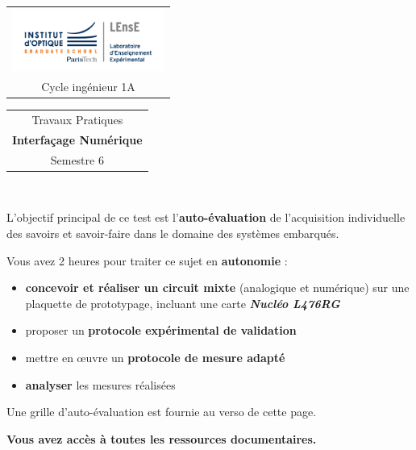 \Large 
\begin{tabular}{c}
\includegraphics[width=5cm]{logoLEnsE.png}\\
Cycle ingénieur 1A
\end{tabular}
\hfill
\begin{tabular}{c}
Travaux Pratiques \\
\textbf{Interfaçage Numérique} \\
Semestre 6 \\
\end{tabular}\\
\normalsize 

\bigskip

\begin{mdframed}[style=aavbox,frametitle={Test individuel}]
	
L'objectif principal de ce test est l'\textbf{auto-évaluation} de l'acquisition individuelle des savoirs et savoir-faire dans le domaine des systèmes embarqués.

Vous avez 2 heures pour traiter ce sujet en \textbf{autonomie} :
\begin{itemize}
	\item \textbf{concevoir et réaliser un circuit mixte} (analogique et numérique) sur une plaquette de prototypage, incluant une carte \textbf{\textit{Nucléo L476RG}}
	\item proposer un \textbf{protocole expérimental de validation}
	\item mettre en \oe{}uvre un \textbf{protocole de mesure adapté}
	\item \textbf{analyser} les mesures réalisées
\end{itemize}

Une grille d'auto-évaluation est fournie au verso de cette page. 

\textbf{Vous avez accès à toutes les ressources documentaires.}
\end{mdframed}	

\medskip